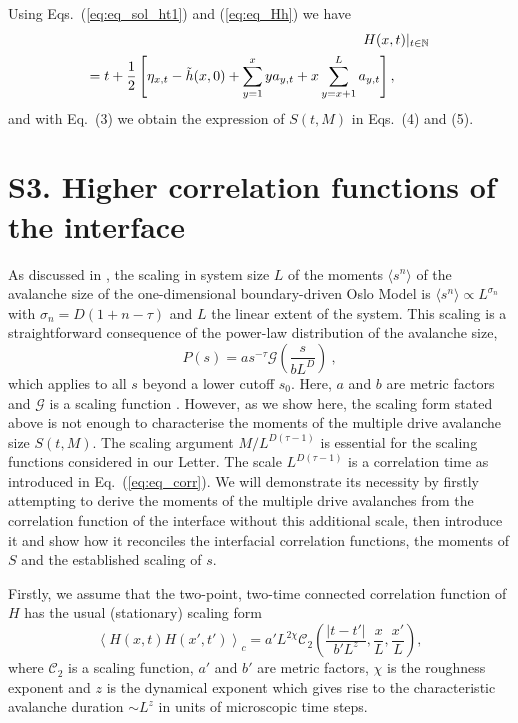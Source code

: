 \documentclass[doublecol]{epl2}
\newcommand{\ave}[1]{\left\langle{#1}\right\rangle}
\newcommand{\elabel}[1]{\label{eq:#1}}
\newcommand{\eref}[1]{(\ref{eq:#1})}
\newcommand{\Eref}[1]{Eq.~(\ref{eq:#1})}
\newcommand{\Esref}[1]{Eqs.~(\ref{eq:#1})}
\newcommand{\bungledXR}[2]{#2}
\begin{document}
 Using \Esref{eq_sol_ht1} and \eref{eq_Hh} we have
 \begin{eqnarray}
&&\hspace{-10pt}{H}(x,t)|_{t\in\mathbb{N}} \nonumber \\
&& \hspace{-10pt}=  {t}  +  \frac{1}{2}\left[\eta_{x,t} - \tilde{h}
 (x,0) +\sum_{y=1}^x y a_{y,t} + x \sum_{y=x+1}^La_{y,t}\right], \hspace{25pt} \elabel{eq_sol_H}
 \end{eqnarray}
 and with \bungledXR{\Eref{eq_def_S}}{Eq.~(3)} we obtain the expression of $S(t,M)$ in \bungledXR{\Esref{eq_SM}}{Eqs.~(4)} and \bungledXR{\eref{eq_xi1}}{(5)}.

\section{S3. Higher correlation functions of the interface}
\label{sect_app1}
As discussed in \cite{pruessner2012self}, the scaling in system size $L$ of the moments
$\langle s^n\rangle$ of the avalanche size of the one-dimensional boundary-driven
Oslo Model is $\langle s^n\rangle\propto L^{\sigma_n}$ with $\sigma_n=D(1+n-\tau)$
and $L$ the linear extent of the system. This scaling is a straightforward
consequence of the power-law distribution of the avalanche size,
\begin{equation}
P(s)=as^ {-\tau}\mathcal{G}\left(
\frac{s}{bL^D}\right)\ ,
\end{equation}
which applies to all $s$ beyond
a lower cutoff
$s_0$. Here,  $a$ and $b$ are metric factors and $\mathcal{G}$ is a scaling
function \cite{ChristensenETAL:1996, PhysRevE.94.042314, pruessner2012self}.
However, as we show here, the scaling form stated above is not enough
to characterise the moments of the multiple drive avalanche size $S(t,M)$.
The scaling argument $M/L^{D(\tau-1)}$ is essential for the scaling functions
considered in our Letter. The scale $L^{D(\tau-1)}$ is a correlation time
as introduced in \Eref{eq_corr}. We will demonstrate its necessity by firstly
attempting to derive the moments of the multiple
drive avalanches from the correlation function of the interface without
this additional scale, then introduce it and show how it reconciles the
interfacial correlation functions, the moments of $S$ and the established scaling
of $s$.

Firstly, we assume that the two-point, two-time connected correlation function
of $H$ has the usual (stationary) scaling form \cite{krug1997origins,
barabasi1995fractal}
\begin{equation}
\ave{H(x,t)H(x',t')}_c = a' L^{2\chi}\mathcal{C}_2\left(\frac{|t-t'|}{b'L^z},\frac{x}{L},\frac{x'}{L}\right),
\elabel{eq_2pointH_corr_func}
\end{equation}
where $\mathcal{C}_2$ is a scaling function, $a'$ and $b'$ are metric factors, $\chi$ is the roughness exponent and $z$ is the dynamical exponent which gives rise to the characteristic avalanche duration $\sim L^z$ in units of microscopic time steps.
\end{document}
